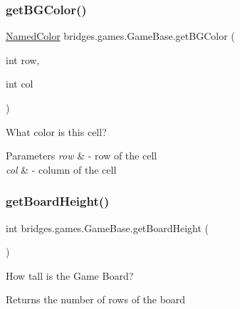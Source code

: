 \subsubsection{\texorpdfstring{get\+B\+G\+Color()}{getBGColor()}}
{\footnotesize\ttfamily \hyperlink{enumbridges_1_1base_1_1_named_color}{Named\+Color} bridges.\+games.\+Game\+Base.\+get\+B\+G\+Color (\begin{DoxyParamCaption}\item[{int}]{row,  }\item[{int}]{col }\end{DoxyParamCaption})\hspace{0.3cm}{\ttfamily [protected]}}



What color is this cell? 


\begin{DoxyParams}{Parameters}
{\em row} & -\/ row of the cell \\
\hline
{\em col} & -\/ column of the cell \\
\hline
\end{DoxyParams}
\mbox{\label{classbridges_1_1games_1_1_game_base_a1effb2a789eb19eb81dec64f25be233e}} 
\subsubsection{\texorpdfstring{get\+Board\+Height()}{getBoardHeight()}}
{\footnotesize\ttfamily int bridges.\+games.\+Game\+Base.\+get\+Board\+Height (\begin{DoxyParamCaption}{ }\end{DoxyParamCaption})\hspace{0.3cm}{\ttfamily [protected]}}



How tall is the Game Board? 

\begin{DoxyReturn}{Returns}
the number of rows of the board 
\end{DoxyReturn}
\mbox{\label{classbridges_1_1games_1_1_game_base_a33018840a6f19eb54ef27e55231871f5}} 
